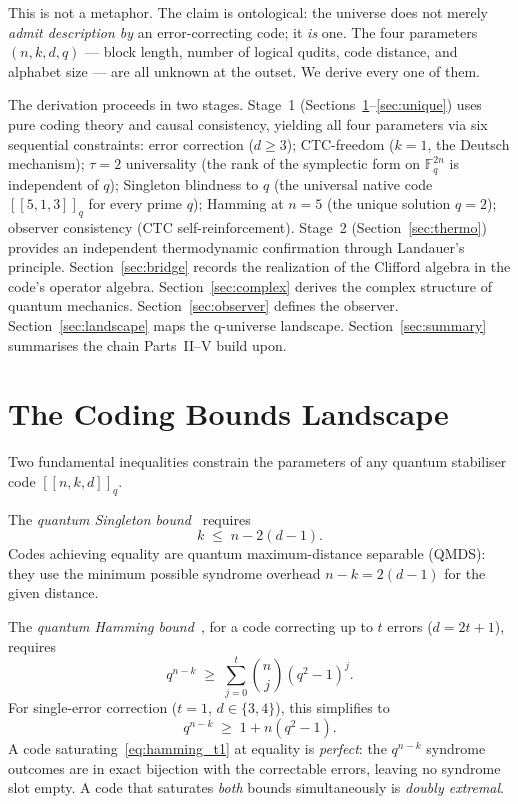 \documentclass[11pt,a4paper]{article}
\newcommand{\Cq}[4]{[\![#1,#2,#3]\!]_{#4}}
\begin{document}
\noindent
This is not a metaphor. The claim is ontological: the universe does not merely \emph{admit description by} an error-correcting code; it \emph{is} one. The four parameters $(n,k,d,q)$ --- block length, number of logical qudits, code distance, and alphabet size --- are all unknown at the outset. We derive every one of them.

The derivation proceeds in two stages. Stage~1 (Sections~\ref{sec:bounds}--\ref{sec:unique}) uses pure coding theory and causal consistency, yielding all four parameters via six sequential constraints: error correction ($d\geq3$); CTC-freedom ($k=1$, the Deutsch mechanism); $\tau=2$ universality (the rank of the symplectic form on $\mathbb{F}_q^{2n}$ is independent of $q$); Singleton blindness to $q$ (the universal native code $\Cq{5}{1}{3}{q}$ for every prime $q$); Hamming at $n=5$ (the unique solution $q=2$); observer consistency (CTC self-reinforcement). Stage~2 (Section~\ref{sec:thermo}) provides an independent thermodynamic confirmation through Landauer's principle. Section~\ref{sec:bridge} records the realization of the Clifford algebra in the code's operator algebra. Section~\ref{sec:complex} derives the complex structure of quantum mechanics. Section~\ref{sec:observer} defines the observer. Section~\ref{sec:landscape} maps the q-universe landscape. Section~\ref{sec:summary} summarises the chain Parts~II--V build upon.

\section{The Coding Bounds Landscape}
\label{sec:bounds}

Two fundamental inequalities constrain the parameters of any quantum stabiliser code $\Cq{n}{k}{d}{q}$.

The \emph{quantum Singleton bound}~\cite{KnillLaflamme1997, Rains1999} requires
\begin{equation}
  k \;\leq\; n - 2(d-1).
  \label{eq:singleton}
\end{equation}
Codes achieving equality are quantum maximum-distance separable (QMDS): they use the minimum possible syndrome overhead $n-k = 2(d-1)$ for the given distance.

The \emph{quantum Hamming bound}~\cite{Ekert1996,Gottesman1996}, for a code correcting up to $t$ errors ($d=2t+1$), requires
\begin{equation}
  q^{n-k} \;\geq\; \sum_{j=0}^{t}\binom{n}{j}(q^2-1)^j.
  \label{eq:hamming}
\end{equation}
For single-error correction ($t=1$, $d\in\{3,4\}$), this simplifies to
\begin{equation}
  q^{n-k} \;\geq\; 1 + n(q^2-1).
  \label{eq:hamming_t1}
\end{equation}
A code saturating~\eqref{eq:hamming_t1} at equality is \emph{perfect}: the $q^{n-k}$ syndrome outcomes are in exact bijection with the correctable errors, leaving no syndrome slot empty. A code that saturates \emph{both} bounds simultaneously is \emph{doubly extremal}.
\end{document}
